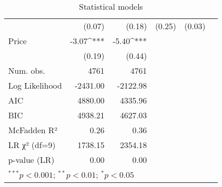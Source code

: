 \begin{table}
\begin{center}
\begin{tabular}{l D{.}{.}{5.5} D{.}{.}{5.5} D{.}{.}{2.5} D{.}{.}{2.5} D{.}{.}{3.2}}
                                   & (0.07)      & (0.18)      & (0.25)      & (0.03)     &        \\
Price                              & -3.07^{***} & -5.40^{***} &             &            &        \\
                                   & (0.19)      & (0.44)      &             &            &        \\
\midrule
Num. obs.                          & 4761        & 4761        &             &            &        \\
Log Likelihood                     & -2431.00    & -2122.98    &             &            &        \\
AIC                                & 4880.00     & 4335.96     &             &            &        \\
BIC                                & 4938.21     & 4627.03     &             &            &        \\
McFadden R²                        & 0.26        & 0.36        &             &            &        \\
LR χ² (df=9)                       & 1738.15     & 2354.18     &             &            &        \\
p-value (LR)                       & 0.00        & 0.00        &             &            &        \\
\bottomrule
{}
\end{tabular}
\caption{Statistical models}
\label{table:coefficients}
\end{center}
\end{table}
